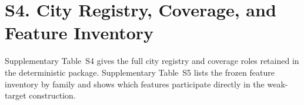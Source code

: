 \section{S4. City Registry, Coverage, and Feature Inventory}

Supplementary Table~S4 gives the full city registry and coverage roles retained in the deterministic package. Supplementary Table~S5 lists the frozen feature inventory by family and shows which features participate directly in the weak-target construction.





